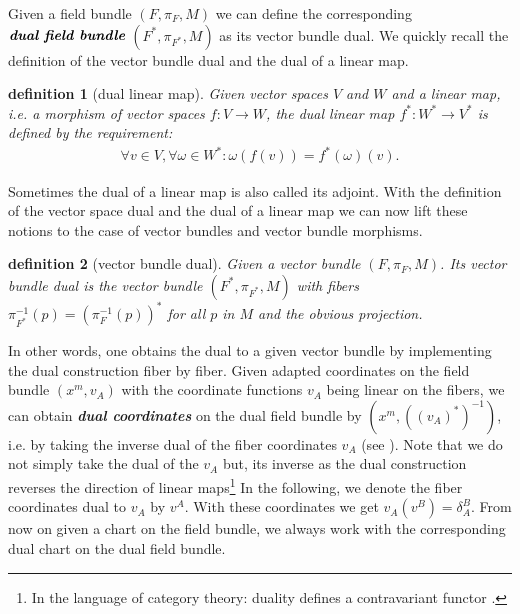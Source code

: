 \documentclass[a4paper,12pt, DIV=14, BCOR=5mm, twoside, headsepline, numbers=noenddot]{scrbook}
\newtheorem{definition}{definition}[section]
\begin{document}
Given a field bundle $(F, \pi_F, M)$ we can define the corresponding $\textit{\textbf{dual field bundle}}$ $(F^{\ast}, \pi_{F^{\ast}},M)$ as its vector bundle dual. We quickly recall the definition of the vector bundle dual and the dual of a linear map.
\begin{definition}[dual linear map] \label{dual}
Given vector spaces $V$ and $W$ and a linear map, i.e. a morphism of vector spaces $f : V \rightarrow W$, the dual linear map $f^{\ast} : W^{\ast} \rightarrow V^{\ast}$ is defined by the requirement: 
\begin{align}
    \forall v \in V, \forall \omega \in W^{\ast} : \omega (f(v)) = f^{\ast}(\omega) (v).
\end{align}
\end{definition}
Sometimes the dual of a linear map is also called its adjoint. With the definition of the vector space dual and the dual of a linear map we can now lift these notions to the case of vector bundles and vector bundle morphisms.
\begin{definition} [vector bundle dual]
Given a vector bundle $(F, \pi_F,M)$. Its vector bundle dual is the vector bundle $(F^{\ast}, \pi_{F^{\ast}},M)$ with fibers $\pi_{F^{\ast}}^{-1}(p) = (\pi_F^{-1}(p))^{\ast} $ for all $p$ in $M$ and the obvious projection.  
\end{definition}

In other words, one obtains the dual to a given vector bundle by implementing the dual construction fiber by fiber.
Given adapted coordinates on the field bundle $(x^m, v_A)$ with the coordinate functions $v_A$ being linear on the fibers, we can obtain \textbf{\textit{dual coordinates}} on the dual field bundle by $(x^m, ((v_A)^{\ast})^{-1})$, i.e. by taking the inverse dual of the fiber coordinates $v_A$ (see \cite{saunders_1989}). Note that we do not simply take the dual of the $v_A$ but, its inverse as the dual construction reverses the direction of linear maps\footnote{In the language of category theory: duality defines a contravariant functor \cite{MacLane:205493}.} In the following, we denote the fiber coordinates dual to $v_A$ by $v^A$. With these coordinates we get $ v_A(v^B) = \delta_A^B$. From now on given a chart on the field bundle, we always work with the corresponding dual chart on the dual field bundle.
\end{document}
